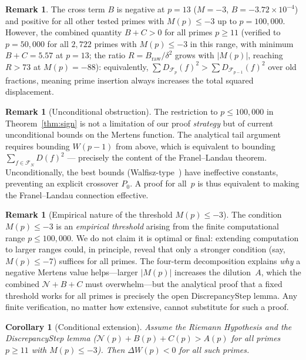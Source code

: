 \documentclass[11pt]{article}
\newtheorem{corollary}[theorem]{Corollary}
\theoremstyle{definition}
\newtheorem{remark}[theorem]{Remark}
\newcommand{\F}{\mathcal{F}}
\begin{document}
\begin{remark}
The cross term $B$ is negative at $p = 13$ ($M = -3$,
$B = -3.72 \times 10^{-4}$) and positive for all other
tested primes with $M(p) \le -3$ up to $p = 100{,}000$.
However, the combined quantity $B + C > 0$ for all primes
$p \ge 11$ (verified to $p = 50{,}000$ for all $2{,}722$ primes
with $M(p) \le -3$ in this range, with minimum $B+C = 5.57$
at $p = 13$; the ratio $R = B_{\mathrm{raw}}/\delta^2$ grows
with $|M(p)|$, reaching $R > 73$ at $M(p) = -88$):
equivalently, $\sum D_{\F_p}(f)^2 > \sum D_{\F_{p-1}}(f)^2$
over old fractions, meaning prime insertion always increases
the total squared displacement.
\end{remark}

\begin{remark}[Unconditional obstruction]\label{rem:obstruction}
The restriction to $p \le 100{,}000$ in
Theorem~\ref{thm:sign} is not a limitation of our proof
\emph{strategy} but of current unconditional bounds on the
Mertens function.  The analytical tail argument requires
bounding $W(p-1)$ from above, which is equivalent to
bounding $\sum_{f \in \F_N}D(f)^2$ --- precisely the content
of the Franel--Landau theorem.  Unconditionally, the best
bounds (Walfisz-type~\cite{Walfisz1963}) have ineffective constants, preventing
an explicit crossover $P_0$.  A proof for all~$p$ is thus
equivalent to making the Franel--Landau connection effective.
\end{remark}

\begin{remark}[Empirical nature of the threshold $M(p) \le -3$]%
\label{rem:threshold}
The condition $M(p) \le -3$ is an \emph{empirical threshold}
arising from the finite computational range $p \le 100{,}000$.
We do not claim it is optimal or final: extending computation to
larger ranges could, in principle, reveal that only a stronger
condition (say, $M(p) \le -7$) suffices for all primes.
The four-term decomposition explains \emph{why} a negative Mertens
value helps---larger $|M(p)|$ increases the dilution~$A$,
which the combined $\mathcal{N} + B + C$ must overwhelm---but
the analytical proof that a fixed threshold works for all
primes is precisely the open DiscrepancyStep lemma.
Any finite verification, no matter how extensive, cannot
substitute for such a proof.
\end{remark}

\begin{corollary}[Conditional extension]\label{cor:rh-sign}
Assume the Riemann Hypothesis and the DiscrepancyStep lemma
($\mathcal{N}(p) + B(p) + C(p) > A(p)$ for all primes $p \ge 11$
with $M(p) \le -3$).  Then $\Delta W(p) < 0$ for all such primes.
\end{corollary}
\end{document}
